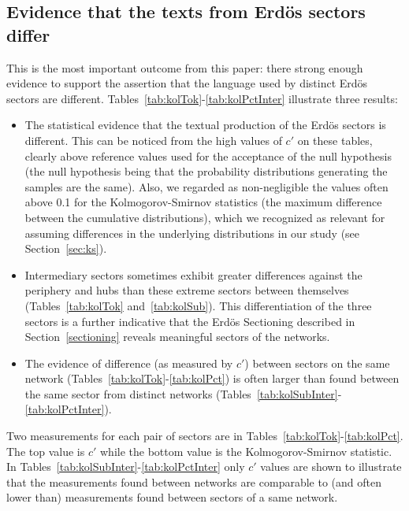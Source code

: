 \documentclass[review]{elsarticle}
\begin{document}
\subsection{Evidence that the texts from Erd\"os sectors differ}\label{subsec:di}
This is the most important outcome from this paper: there strong enough evidence
to support the assertion that the language used by distinct Erd\"os sectors are different.
Tables~\ref{tab:kolTok}-\ref{tab:kolPctInter}
illustrate three results:
\begin{itemize}
 \item The statistical evidence that the textual production of the Erd\"os sectors is different.
	 This can be noticed from the high values of $c'$ on these tables, clearly above reference values used for the acceptance of the null hypothesis (the null hypothesis being that the probability distributions generating the samples are the same). Also, we regarded as non-negligible the values often above 0.1 for the Kolmogorov-Smirnov statistics (the maximum difference between the cumulative distributions), which we recognized as relevant for assuming differences in the underlying distributions in our study (see Section~\ref{sec:ks}).
  \item Intermediary sectors sometimes exhibit greater differences 
against the periphery and hubs than these extreme sectors between themselves 
(Tables~\ref{tab:kolTok} and~\ref{tab:kolSub}).
This differentiation of the three sectors is a further indicative that the Erd\"os Sectioning described in Section~\ref{sectioning} reveals meaningful sectors of the networks.
 \item The evidence of difference (as measured by $c'$) between sectors on the same network (Tables~\ref{tab:kolTok}-\ref{tab:kolPct}) is often larger than found between the same sector from distinct networks (Tables~\ref{tab:kolSubInter}-\ref{tab:kolPctInter}).
 \end{itemize}

Two measurements for each pair of sectors are in Tables~\ref{tab:kolTok}-\ref{tab:kolPct}.
 The top value is $c'$ while the bottom value is the Kolmogorov-Smirnov statistic.
 In Tables~\ref{tab:kolSubInter}-\ref{tab:kolPctInter} only $c'$ values are shown to illustrate
 that the measurements found between networks are comparable to (and often lower than) measurements found between sectors of a same network.
 
 
 

 
 
 
 
\end{document}
